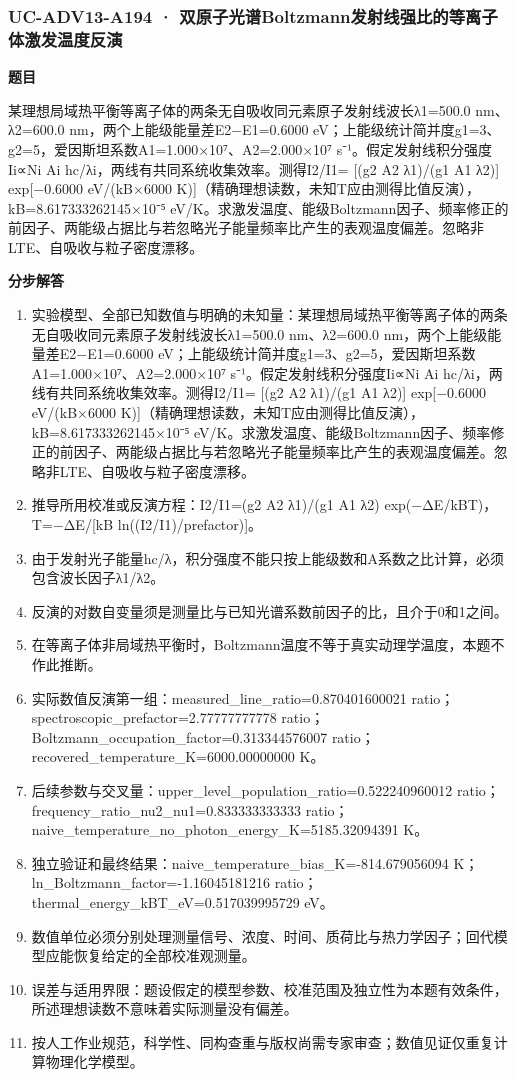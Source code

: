 \documentclass[UTF8,11pt,a4paper]{ctexart}
\begin{document}
\subsubsection*{UC-ADV13-A194 · 双原子光谱Boltzmann发射线强比的等离子体激发温度反演}
\noindent\textbf{题目}\par
某理想局域热平衡等离子体的两条无自吸收同元素原子发射线波长λ1=500.0 nm、λ2=600.0 nm，两个上能级能量差E2−E1=0.6000 eV；上能级统计简并度g1=3、g2=5，爱因斯坦系数A1=1.000×10⁷、A2=2.000×10⁷ s⁻¹。假定发射线积分强度Ii∝Ni Ai hc/λi，两线有共同系统收集效率。测得I2/I1= [(g2 A2 λ1)/(g1 A1 λ2)] exp[−0.6000 eV/(kB×6000 K)]（精确理想读数，未知T应由测得比值反演），kB=8.617333262145×10⁻⁵ eV/K。求激发温度、能级Boltzmann因子、频率修正的前因子、两能级占据比与若忽略光子能量频率比产生的表观温度偏差。忽略非LTE、自吸收与粒子密度漂移。\par
\medskip\noindent\textbf{分步解答}
\begin{enumerate}
\item 实验模型、全部已知数值与明确的未知量：某理想局域热平衡等离子体的两条无自吸收同元素原子发射线波长λ1=500.0 nm、λ2=600.0 nm，两个上能级能量差E2−E1=0.6000 eV；上能级统计简并度g1=3、g2=5，爱因斯坦系数A1=1.000×10⁷、A2=2.000×10⁷ s⁻¹。假定发射线积分强度Ii∝Ni Ai hc/λi，两线有共同系统收集效率。测得I2/I1= [(g2 A2 λ1)/(g1 A1 λ2)] exp[−0.6000 eV/(kB×6000 K)]（精确理想读数，未知T应由测得比值反演），kB=8.617333262145×10⁻⁵ eV/K。求激发温度、能级Boltzmann因子、频率修正的前因子、两能级占据比与若忽略光子能量频率比产生的表观温度偏差。忽略非LTE、自吸收与粒子密度漂移。
\item 推导所用校准或反演方程：I2/I1=(g2 A2 λ1)/(g1 A1 λ2) exp(−ΔE/kBT)，T=−ΔE/[kB ln((I2/I1)/prefactor)]。
\item 由于发射光子能量hc/λ，积分强度不能只按上能级数和A系数之比计算，必须包含波长因子λ1/λ2。
\item 反演的对数自变量须是测量比与已知光谱系数前因子的比，且介于0和1之间。
\item 在等离子体非局域热平衡时，Boltzmann温度不等于真实动理学温度，本题不作此推断。
\item 实际数值反演第一组：measured\_line\_ratio=0.870401600021 ratio；spectroscopic\_prefactor=2.77777777778 ratio；Boltzmann\_occupation\_factor=0.313344576007 ratio；recovered\_temperature\_K=6000.00000000 K。
\item 后续参数与交叉量：upper\_level\_population\_ratio=0.522240960012 ratio；frequency\_ratio\_nu2\_nu1=0.833333333333 ratio；naive\_temperature\_no\_photon\_energy\_K=5185.32094391 K。
\item 独立验证和最终结果：naive\_temperature\_bias\_K=-814.679056094 K；ln\_Boltzmann\_factor=-1.16045181216 ratio；thermal\_energy\_kBT\_eV=0.517039995729 eV。
\item 数值单位必须分别处理测量信号、浓度、时间、质荷比与热力学因子；回代模型应能恢复给定的全部校准观测量。
\item 误差与适用界限：题设假定的模型参数、校准范围及独立性为本题有效条件，所述理想读数不意味着实际测量没有偏差。
\item 按人工作业规范，科学性、同构查重与版权尚需专家审查；数值见证仅重复计算物理化学模型。
\end{enumerate}
\end{document}
